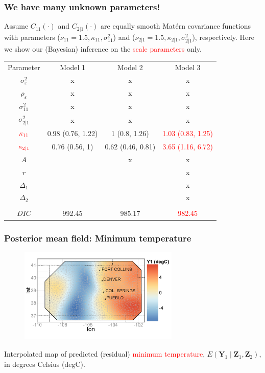 \documentclass{beamer}
\newcommand{\Yvec}{\mathbf{Y}}
\newcommand{\Zvec}{\mathbf{Z}}
\newcommand{\E}{E}
\begin{document}

\begin{frame}
\frametitle{We have many unknown parameters!}
\vspace{-.5cm}
Assume $C_{11}(\cdot)$ and $C_{2|1}(\cdot)$ are equally smooth Mat{\'e}rn covariance functions with parameters ($\nu_{11}=1.5, \kappa_{11}, \sigma_{11}^2$) and ($\nu_{2|1}=1.5,\kappa_{2|1},\sigma_{2|1}^2$), respectively. Here we show our (Bayesian) inference on the \textcolor{red}{scale parameters} only.
\small
\begin{center}
\begin{tabular} {cccc}
  { Parameter} 	& {Model 1} 	& {Model 2} & {Model 3} 			 \\
  $\sigma_\varepsilon^2$&  x & x & x \\
  $\rho_\varepsilon$&  x & x & x \\
  $\sigma^2_{11}$& x & x & x \\
  $\sigma^2_{2|1}$& x & x & x \\
  $\textcolor{red}{\kappa_{11}}$&0.98 (0.76, 1.22)&1 (0.8, 1.26)&\textcolor{red}{1.03 (0.83, 1.25)}\\
  $\textcolor{red}{\kappa_{2|1}}$&0.76 (0.56, 1)&0.62 (0.46, 0.81)&\textcolor{red}{3.65 (1.16, 6.72)}\\
  $A$&& x & x \\
  $r$&&& x \\
  $\Delta_1$&&& x\\
  $\Delta_2$&&& x \\
  &&&\\
  $DIC$&992.45&985.17&\textcolor{red}{982.45}
\end{tabular}
\end{center}
\normalsize
\end{frame}


\begin{frame}
\frametitle{Posterior mean field: Minimum temperature}

\begin{figure}
\includegraphics[width=3in]{Fig3a1.png}
\end{figure}
\vspace{-.5cm}
Interpolated map of predicted (residual) \textcolor{red}{minimum temperature}, $\E(\Yvec_1 \mid  \Zvec_1,\Zvec_2)$, in degrees Celsius (degC).
\end{frame}
\end{document}
